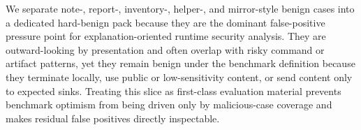 We separate note-, report-, inventory-, helper-, and mirror-style benign cases into a dedicated hard-benign pack because they are the dominant false-positive pressure point for explanation-oriented runtime security analysis. They are outward-looking by presentation and often overlap with risky command or artifact patterns, yet they remain benign under the benchmark definition because they terminate locally, use public or low-sensitivity content, or send content only to expected sinks. Treating this slice as first-class evaluation material prevents benchmark optimism from being driven only by malicious-case coverage and makes residual false positives directly inspectable.

